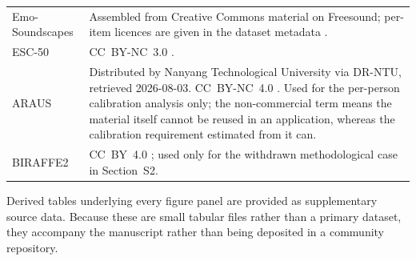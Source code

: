 \begin{table}[htbp]
\begin{tabular}{p{2.2cm}p{11.4cm}}
Emo-Soundscapes & Assembled from Creative Commons material on Freesound;
per-item licences are given in the dataset metadata \cite{fan2017emo}. \\
\addlinespace
ESC-50 & CC~BY-NC~3.0 \cite{piczak2015}. \\
\addlinespace
ARAUS & Distributed by Nanyang Technological University via DR-NTU, retrieved
2026-08-03. CC~BY-NC~4.0 \cite{ooi2024araus}. Used for the per-person
calibration analysis only; the non-commercial term means the material itself
cannot be reused in an application, whereas the calibration requirement
estimated from it can. \\
\addlinespace
BIRAFFE2 & CC~BY~4.0 \cite{kutt2022}; used only for the withdrawn
methodological case in Section~S2. \\
\bottomrule
\end{tabular}
\end{table}

Derived tables underlying every figure panel are provided as supplementary
source data. Because these are small tabular files rather than a primary
dataset, they accompany the manuscript rather than being deposited in a
community repository.




